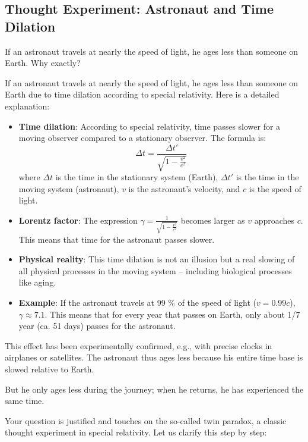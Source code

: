 \documentclass[a4paper,12pt]{article}
\begin{document}
	\subsection{Thought Experiment: Astronaut and Time Dilation}
	If an astronaut travels at nearly the speed of light, he ages less than someone on Earth. Why exactly?
	
	If an astronaut travels at nearly the speed of light, he ages less than someone on Earth due to time dilation according to special relativity. Here is a detailed explanation:
	
	\begin{itemize}
		\item \textbf{Time dilation}: According to special relativity, time passes slower for a moving observer compared to a stationary observer. The formula is:
		\[
		\Delta t = \frac{\Delta t'}{\sqrt{1 - \frac{v^2}{c^2}}}
		\]
		where \( \Delta t \) is the time in the stationary system (Earth), \( \Delta t' \) is the time in the moving system (astronaut), \( v \) is the astronaut's velocity, and \( c \) is the speed of light.
		\item \textbf{Lorentz factor}: The expression \( \gamma = \frac{1}{\sqrt{1 - \frac{v^2}{c^2}}} \) becomes larger as \( v \) approaches \( c \). This means that time for the astronaut passes slower.
		\item \textbf{Physical reality}: This time dilation is not an illusion but a real slowing of all physical processes in the moving system – including biological processes like aging.
		\item \textbf{Example}: If the astronaut travels at 99 \% of the speed of light (\( v = 0.99c \)), \( \gamma \approx 7.1 \). This means that for every year that passes on Earth, only about 1/7 year (ca. 51 days) passes for the astronaut.
	\end{itemize}
	
	This effect has been experimentally confirmed, e.g., with precise clocks in airplanes or satellites. The astronaut thus ages less because his entire time base is slowed relative to Earth.
	
	But he only ages less during the journey; when he returns, he has experienced the same time.
	
	Your question is justified and touches on the so-called twin paradox, a classic thought experiment in special relativity. Let us clarify this step by step:
	
\end{document}
